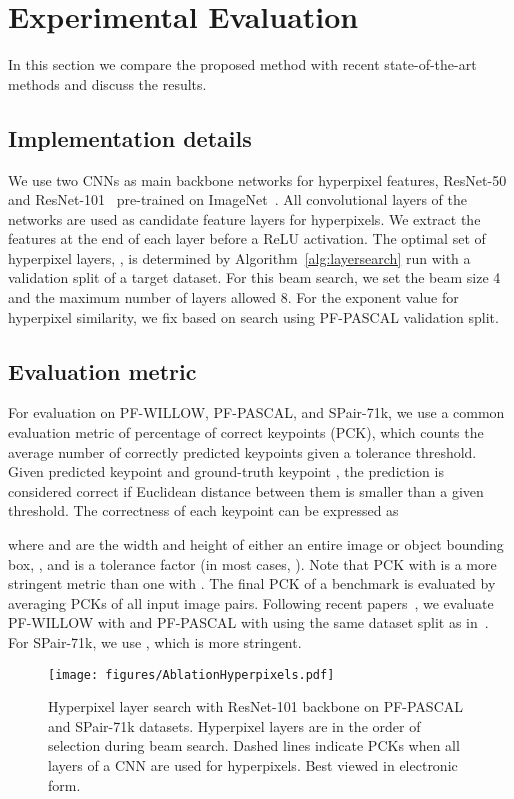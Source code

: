 \documentclass[10pt,twocolumn,letterpaper]{article}
\begin{document}
%
 

\section{Experimental Evaluation}
In this section we compare the proposed method with recent state-of-the-art methods and discuss the results.

\subsection{Implementation details}
We use two CNNs as main backbone networks for hyperpixel features, ResNet-50 and ResNet-101~\cite{he2016deep} pre-trained on ImageNet~\cite{deng2009imagenet}. All convolutional layers of the networks are used as candidate feature layers for hyperpixels. We extract the features at the end of each layer before a ReLU activation. The optimal set of hyperpixel layers, ,  
is determined by Algorithm~\ref{alg:layersearch} run with a validation split of a target dataset. For this beam search, we set the beam size 4 and the maximum number of layers allowed 8.
For the exponent value for hyperpixel similarity, we fix  based on search using PF-PASCAL validation split. 

\subsection{Evaluation metric}\label{sec:PCK}
For evaluation on PF-WILLOW, PF-PASCAL, and SPair-71k, we use a common evaluation metric of percentage of correct keypoints (PCK), which counts the average number of correctly predicted keypoints given a tolerance threshold. Given predicted keypoint  and ground-truth keypoint , the prediction is considered correct if Euclidean distance between them is smaller than a given threshold. The correctness  of each keypoint can be expressed as 

where  and  are the width and height of either an entire image or object bounding box, , and  is a tolerance factor (in most cases, ). Note that PCK with  is a more stringent metric than one with . The final PCK of a benchmark is evaluated by averaging PCKs of all input image pairs. Following recent papers~\cite{han2017scnet, Rocco17, Rocco18, rocco2018neighbourhood}, we evaluate PF-WILLOW with  and PF-PASCAL with  using the same dataset split as in~\cite{rocco2018neighbourhood}. For SPair-71k, we use , which is more stringent. 

\begin{figure}[t]
    \begin{center}
\texttt{[image: figures/AblationHyperpixels.pdf]}
    \end{center}
     \vspace{-5.5mm}
    \caption{Hyperpixel layer search with ResNet-101 backbone on PF-PASCAL and SPair-71k datasets. Hyperpixel layers are in the order of selection during beam search. Dashed lines indicate PCKs when all layers of a CNN are used for hyperpixels. Best viewed in electronic form.}
    \vspace{-5.0mm}
    \label{fig:hyperpixelAblation}
\end{figure}
\end{document}
